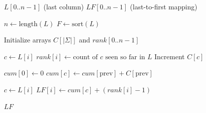 \begin{algorithm}[H]
\caption{Compute LF-Mapping}
\label{alg:lf-mapping}
\begin{algorithmic}[1]
\Require \(L[0..n-1]\) (last column)
\Ensure \(LF[0..n-1]\) (last-to-first mapping)

\State \(n \gets \text{length}(L)\)
\State \(F \gets \text{sort}(L)\) 

\State {}
\State Initialize arrays \(C[|\Sigma|]\) and \(rank[0..n-1]\)

    \State \(c \gets L[i]\)
    \State \(rank[i] \gets \text{count of } c \text{ seen so far in } L\) 
    \State Increment \(C[c]\)
\EndFor

\State {}
\State \(cum[0] \gets 0\)
    \State \(cum[c] \gets cum[\text{prev}] + C[\text{prev}]\)
\EndFor

\State {}
    \State \(c \gets L[i]\)
    \State \(LF[i] \gets cum[c] + (rank[i] - 1)\) 
\EndFor

\State \Return \(LF\)
\end{algorithmic}
\end{algorithm}

\newpage

